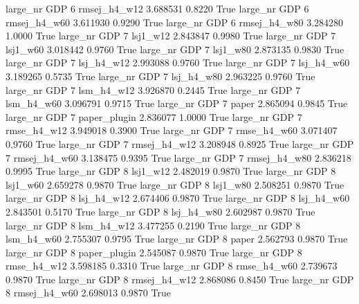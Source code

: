   large_nr      GDP                 6 rmsej_h4_w12    3.688531      0.8220    True
  large_nr      GDP                 6 rmsej_h4_w60    3.611930      0.9290    True
  large_nr      GDP                 6 rmsej_h4_w80    3.284280      1.0000    True
  large_nr      GDP                 7     lsj1_w12    2.843847      0.9980    True
  large_nr      GDP                 7     lsj1_w60    3.018442      0.9760    True
  large_nr      GDP                 7     lsj1_w80    2.873135      0.9830    True
  large_nr      GDP                 7   lsj_h4_w12    2.993088      0.9760    True
  large_nr      GDP                 7   lsj_h4_w60    3.189265      0.5735    True
  large_nr      GDP                 7   lsj_h4_w80    2.963225      0.9760    True
  large_nr      GDP                 7   lsm_h4_w12    3.926870      0.2445    True
  large_nr      GDP                 7   lsm_h4_w60    3.096791      0.9715    True
  large_nr      GDP                 7        paper    2.865094      0.9845    True
  large_nr      GDP                 7 paper_plugin    2.836077      1.0000    True
  large_nr      GDP                 7  rmse_h4_w12    3.949018      0.3900    True
  large_nr      GDP                 7  rmse_h4_w60    3.071407      0.9760    True
  large_nr      GDP                 7 rmsej_h4_w12    3.208948      0.8925    True
  large_nr      GDP                 7 rmsej_h4_w60    3.138475      0.9395    True
  large_nr      GDP                 7 rmsej_h4_w80    2.836218      0.9995    True
  large_nr      GDP                 8     lsj1_w12    2.482019      0.9870    True
  large_nr      GDP                 8     lsj1_w60    2.659278      0.9870    True
  large_nr      GDP                 8     lsj1_w80    2.508251      0.9870    True
  large_nr      GDP                 8   lsj_h4_w12    2.674406      0.9870    True
  large_nr      GDP                 8   lsj_h4_w60    2.843501      0.5170    True
  large_nr      GDP                 8   lsj_h4_w80    2.602987      0.9870    True
  large_nr      GDP                 8   lsm_h4_w12    3.477255      0.2190    True
  large_nr      GDP                 8   lsm_h4_w60    2.755307      0.9795    True
  large_nr      GDP                 8        paper    2.562793      0.9870    True
  large_nr      GDP                 8 paper_plugin    2.545087      0.9870    True
  large_nr      GDP                 8  rmse_h4_w12    3.598185      0.3310    True
  large_nr      GDP                 8  rmse_h4_w60    2.739673      0.9870    True
  large_nr      GDP                 8 rmsej_h4_w12    2.868086      0.8450    True
  large_nr      GDP                 8 rmsej_h4_w60    2.698013      0.9870    True

